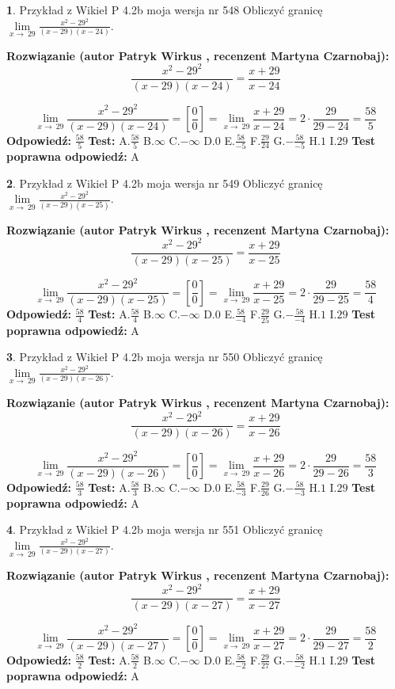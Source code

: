 \documentclass[12pt, a4paper]{article}
\theoremstyle{definition} %
\newtheorem{zad}{}
\newcommand{\zadStart}[1]{\begin{zad}#1\newline}
\newcommand{\zadStop}{\end{zad}}
\newcommand{\rozwStart}[2]{\noindent \textbf{Rozwiązanie (autor #1 , recenzent #2): }\newline}
\newcommand{\rozwStop}{\newline}
\newcommand{\odpStart}{\noindent \textbf{Odpowiedź:}\newline}
\newcommand{\odpStop}{\newline}
\newcommand{\testStart}{\noindent \textbf{Test:}\newline}
\newcommand{\testStop}{\newline}
\newcommand{\kluczStart}{\noindent \textbf{Test poprawna odpowiedź:}\newline}
\newcommand{\kluczStop}{\newline}
\begin{document}
\zadStart{Przykład z Wikieł P 4.2b moja wersja nr 548}
Obliczyć granicę $\lim\limits_{x\to\ 29}\frac{x^{2}-29^{2}}{(x-29)(x-24)}$.
\zadStop
\rozwStart{Patryk Wirkus}{Martyna Czarnobaj}
$$\frac{x^{2}-29^{2}}{(x-29)(x-24)}=\frac{x+29}{x-24}$$

$$\lim\limits_{x\to\ 29}\frac{x^{2}-29^{2}}{(x-29)(x-24)}=[\frac{0}{0}]=\lim\limits_{x\to\ 29}\frac{x+29}{x-24}=2 \cdot \frac{29}{29-24} = \frac{58}{5}$$
\rozwStop
\odpStart
$\frac{58}{5}$
\odpStop
\testStart
A.$\frac{58}{5}$
B.$\infty$
C.$-\infty$
D.$0$
E.$\frac{58}{-5}$
F.$\frac{29}{24}$
G.$-\frac{58}{-5}$
H.$1$
I.$29$
\testStop
\kluczStart
A
\kluczStop



\zadStart{Przykład z Wikieł P 4.2b moja wersja nr 549}
Obliczyć granicę $\lim\limits_{x\to\ 29}\frac{x^{2}-29^{2}}{(x-29)(x-25)}$.
\zadStop
\rozwStart{Patryk Wirkus}{Martyna Czarnobaj}
$$\frac{x^{2}-29^{2}}{(x-29)(x-25)}=\frac{x+29}{x-25}$$

$$\lim\limits_{x\to\ 29}\frac{x^{2}-29^{2}}{(x-29)(x-25)}=[\frac{0}{0}]=\lim\limits_{x\to\ 29}\frac{x+29}{x-25}=2 \cdot \frac{29}{29-25} = \frac{58}{4}$$
\rozwStop
\odpStart
$\frac{58}{4}$
\odpStop
\testStart
A.$\frac{58}{4}$
B.$\infty$
C.$-\infty$
D.$0$
E.$\frac{58}{-4}$
F.$\frac{29}{25}$
G.$-\frac{58}{-4}$
H.$1$
I.$29$
\testStop
\kluczStart
A
\kluczStop



\zadStart{Przykład z Wikieł P 4.2b moja wersja nr 550}
Obliczyć granicę $\lim\limits_{x\to\ 29}\frac{x^{2}-29^{2}}{(x-29)(x-26)}$.
\zadStop
\rozwStart{Patryk Wirkus}{Martyna Czarnobaj}
$$\frac{x^{2}-29^{2}}{(x-29)(x-26)}=\frac{x+29}{x-26}$$

$$\lim\limits_{x\to\ 29}\frac{x^{2}-29^{2}}{(x-29)(x-26)}=[\frac{0}{0}]=\lim\limits_{x\to\ 29}\frac{x+29}{x-26}=2 \cdot \frac{29}{29-26} = \frac{58}{3}$$
\rozwStop
\odpStart
$\frac{58}{3}$
\odpStop
\testStart
A.$\frac{58}{3}$
B.$\infty$
C.$-\infty$
D.$0$
E.$\frac{58}{-3}$
F.$\frac{29}{26}$
G.$-\frac{58}{-3}$
H.$1$
I.$29$
\testStop
\kluczStart
A
\kluczStop



\zadStart{Przykład z Wikieł P 4.2b moja wersja nr 551}
Obliczyć granicę $\lim\limits_{x\to\ 29}\frac{x^{2}-29^{2}}{(x-29)(x-27)}$.
\zadStop
\rozwStart{Patryk Wirkus}{Martyna Czarnobaj}
$$\frac{x^{2}-29^{2}}{(x-29)(x-27)}=\frac{x+29}{x-27}$$

$$\lim\limits_{x\to\ 29}\frac{x^{2}-29^{2}}{(x-29)(x-27)}=[\frac{0}{0}]=\lim\limits_{x\to\ 29}\frac{x+29}{x-27}=2 \cdot \frac{29}{29-27} = \frac{58}{2}$$
\rozwStop
\odpStart
$\frac{58}{2}$
\odpStop
\testStart
A.$\frac{58}{2}$
B.$\infty$
C.$-\infty$
D.$0$
E.$\frac{58}{-2}$
F.$\frac{29}{27}$
G.$-\frac{58}{-2}$
H.$1$
I.$29$
\testStop
\kluczStart
A
\kluczStop
\end{document}
